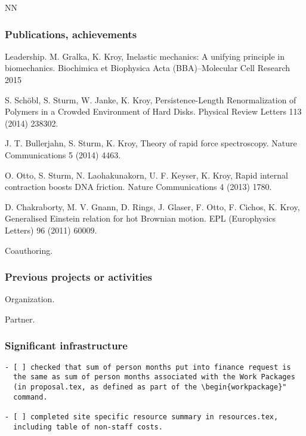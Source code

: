 \begin{sitedescription}
\begin{participant}[type=res,PM=36,salary=5500]{NN}
\end{participant}

\subsubsection*{Publications, achievements}

\begin{compactenum}
\item Leadership.
M. Gralka, K. Kroy, Inelastic mechanics: A unifying principle in biomechanics. 
Biochimica et Biophysica Acta (BBA)--Molecular Cell Research 2015

S. Schöbl, S. Sturm, W. Janke, K. Kroy, Persistence-Length Renormalization of Polymers in a Crowded Environment of Hard Disks.
Physical Review Letters 113 (2014) 238302.

J. T. Bullerjahn, S. Sturm, K. Kroy, Theory of rapid force spectroscopy. Nature Communications 5 (2014) 4463.

O. Otto, S. Sturm, N. Laohakunakorn, U. F. Keyser, K. Kroy, Rapid internal contraction boosts DNA friction.
Nature Communications 4 (2013) 1780.

D. Chakraborty, M. V. Gnann, D. Rings, J. Glaser, F. Otto, F. Cichos, K. Kroy, 
Generalised Einstein relation for hot Brownian motion. EPL (Europhysics Letters) 96 (2011) 60009.

\item Coauthoring.
\end{compactenum}

\subsubsection*{Previous projects or activities}

\begin{compactenum}
\item Organization.
\item Partner.
\end{compactenum}

\subsubsection*{Significant infrastructure}


\end{sitedescription}

\begin{draft}
\vspace{1cm}

\begin{verbatim}
- [ ] checked that sum of person months put into finance request is
  the same as sum of person months associated with the Work Packages
  (in proposal.tex, as defined as part of the \begin{workpackage}"
  command.
  
- [ ] completed site specific resource summary in resources.tex,
  including table of non-staff costs.

\end{verbatim}
\end{draft}

